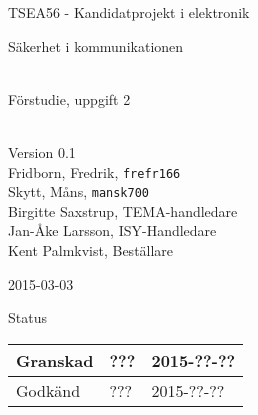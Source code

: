 \documentclass[11pt]{article}
\date{\today} %
\begin{document}
	\begin{titlepage}
		\begin{center}
		TSEA56 - Kandidatprojekt i elektronik \\[0.1in]
    {\Large\begin{bfseries} Säkerhet i kommunikationen\end{bfseries}\\
    \footnotesize Förstudie, uppgift 2}\\\bigskip 
			Version 0.1\\
\vspace{\baselineskip}
			\vspace{\baselineskip}
Fridborn, Fredrik, 
\texttt{frefr166}
\\
Skytt, Måns, 
\texttt{mansk700}
\\\bigskip
Birgitte Saxstrup, TEMA-handledare
\\
Jan-Åke Larsson, ISY-Handledare
\\
Kent Palmkvist, Beställare

\vspace{2\baselineskip}
2015-03-03

\vspace{19\baselineskip}
Status
\begin{longtable}{|l|l|l|} \hline

Granskad &
??? & 
2015-??-?? \\ \hline
Godkänd &
??? &
2015-??-?? \\ \hline
 
\end{longtable}
			
		\end{center}
	\end{titlepage}
	
\end{document}
